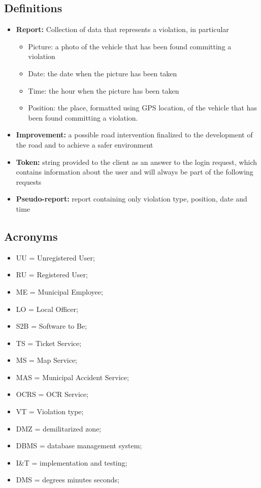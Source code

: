 			\subsection{Definitions}
				\begin{itemize}
					\item \textbf{Report:} Collection of data that represents a violation, in particular
						\begin{itemize}
							\item Picture: a photo of the vehicle that has been found committing a violation
							\item Date: the date when the picture has been taken
							\item Time: the hour when the picture has been taken
							\item Position: the place, formatted using GPS location, of the vehicle that has been found committing a violation.
						\end{itemize}
					\item \textbf{Improvement:} a possible road intervention finalized to the development of the road and to achieve a safer environment
					\item \textbf{Token:} string provided to the client as an answer to the login request, which contains information about the user and will always be part of the following requests
					\item \textbf{Pseudo-report:} report containing only violation type, position, date and time
				\end{itemize}
			\subsection{Acronyms}
				\begin{itemize}
					\item UU = Unregistered User;
					\item RU = Registered User;
					\item ME = Municipal Employee;
					\item LO = Local Officer;
					\item S2B = Software to Be;
					\item TS = Ticket Service;
					\item MS = Map Service;
					\item MAS = Municipal Accident Service;
					\item OCRS = OCR Service;
					\item VT = Violation type;
					\item DMZ = demilitarized zone;
					\item DBMS = database management system;
					\item I\&T = implementation and testing;
					\item DMS = degrees minutes seconds;
				\end{itemize}
					
